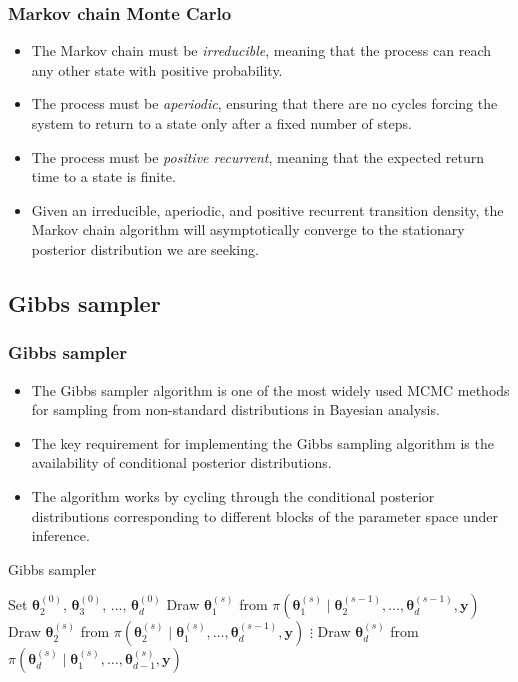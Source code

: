 \documentclass[12pt, compress]{beamer}
\begin{document}
\begin{frame}
	\frametitle{Markov chain Monte Carlo}
	\begin{itemize}
		\item The Markov chain must be \textit{irreducible}, meaning that the process can reach any other state with positive probability.
		\item The process must be \textit{aperiodic}, ensuring that there are no cycles forcing the system to return to a state only after a fixed number of steps.
		\item The process must be \textit{positive recurrent}, meaning that the expected return time to a state is finite.
		\item Given an irreducible, aperiodic, and positive recurrent transition density, the Markov chain algorithm will asymptotically converge to the stationary posterior distribution we are seeking.
	\end{itemize}
\end{frame}

\subsection{Gibbs sampler}
\begin{frame}
	\frametitle{Gibbs sampler}
	\begin{itemize}
		\item The Gibbs sampler algorithm is one of the most widely used MCMC methods for sampling from non-standard distributions in Bayesian analysis.
		\item The key requirement for implementing the Gibbs sampling algorithm is the availability of conditional posterior distributions.
		\item The algorithm works by cycling through the conditional posterior distributions corresponding to different blocks of the parameter space under inference.
	\end{itemize}
\end{frame}

\begin{frame}{Gibbs sampler}
	\begin{algorithm}[H]
		\caption{Gibbs sampling}\label{Alg:Gibbs}
		\begin{algorithmic}[1]  		 			
			\State Set $\bm{\theta}_2^{(0)}$, $\bm{\theta}_3^{(0)}$, ..., $\bm{\theta}_d^{(0)}$
			\State Draw $\bm{\theta}_1^{(s)}$ from $\pi(\bm{\theta}_1^{(s)}\mid \bm{\theta}_2^{(s-1)},\dots,\bm{\theta}_d^{(s-1)},\bm{y})$
			\State Draw $\bm{\theta}_2^{(s)}$ from $\pi(\bm{\theta}_2^{(s)}\mid \bm{\theta}_1^{(s)},\dots,\bm{\theta}_d^{(s-1)},\bm{y})$
			\State $\vdots$
			\State Draw $\bm{\theta}_d^{(s)}$ from $\pi(\bm{\theta}_d^{(s)}\mid \bm{\theta}_1^{(s)},\dots,\bm{\theta}_{d-1}^{(s)},\bm{y})$ 
			\EndFor 
		\end{algorithmic}
	\end{algorithm}
\end{frame}
\end{document}
